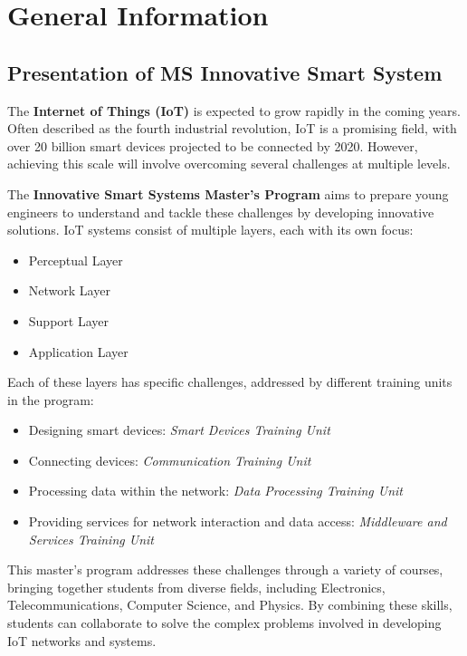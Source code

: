 \chapter{General Information}
\thispagestyle{fancy}


\section{Presentation of MS Innovative Smart System}

The \textbf{Internet of Things (IoT)} is expected to grow rapidly in the coming years. Often described as the fourth industrial revolution, IoT is a promising field, with over 20 billion smart devices projected to be connected by 2020. However, achieving this scale will involve overcoming several challenges at multiple levels. 

The \textbf{Innovative Smart Systems Master’s Program} aims to prepare young engineers to understand and tackle these challenges by developing innovative solutions. IoT systems consist of multiple layers, each with its own focus:

\begin{itemize}
    \item Perceptual Layer
    \item Network Layer
    \item Support Layer
    \item Application Layer
\end{itemize}

Each of these layers has specific challenges, addressed by different training units in the program:

\begin{itemize}
\item Designing smart devices: \textit{Smart Devices Training Unit}
\item Connecting devices: \textit{Communication Training Unit}
\item Processing data within the network: \textit{Data Processing Training Unit}
\item Providing services for network interaction and data access: \textit{Middleware and Services Training Unit}
\end{itemize}

This master’s program addresses these challenges through a variety of courses, bringing together students from diverse fields, including Electronics, Telecommunications, Computer Science, and Physics. By combining these skills, students can collaborate to solve the complex problems involved in developing IoT networks and systems.

